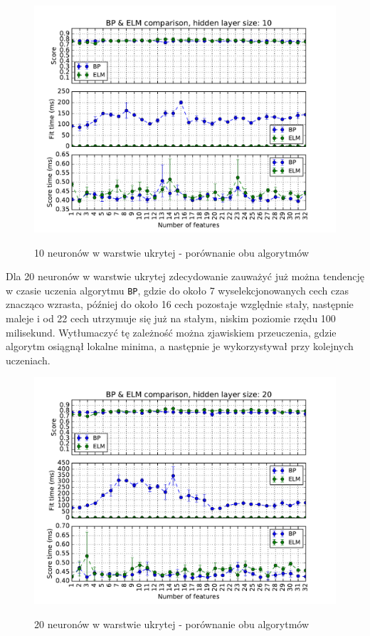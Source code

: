 \begin{figure}[h!]
	\centering
	\includegraphics[width=0.9\linewidth]{img/bp_elm_10.pdf}
	\label{Rysunek}
	\caption{10 neuronów w warstwie ukrytej - porównanie obu algorytmów}
\end{figure}

\newpage

Dla 20 neuronów w warstwie ukrytej zdecydowanie zauważyć już można tendencję w czasie uczenia algorytmu \texttt{BP}, gdzie do około 7 wyselekcjonowanych cech czas znacząco wzrasta, później do około 16 cech pozostaje względnie stały, następnie maleje i od 22 cech utrzymuje się już na stałym, niskim poziomie rzędu 100 milisekund. Wytłumaczyć tę zależność można zjawiskiem przeuczenia, gdzie algorytm osiągnął lokalne minima, a następnie je wykorzystywał przy kolejnych uczeniach.

\begin{figure}[h!]
	\centering
	\includegraphics[width=0.9\linewidth]{img/bp_elm_20.pdf}
	\label{Rysunek}
	\caption{20 neuronów w warstwie ukrytej - porównanie obu algorytmów}
\end{figure}

